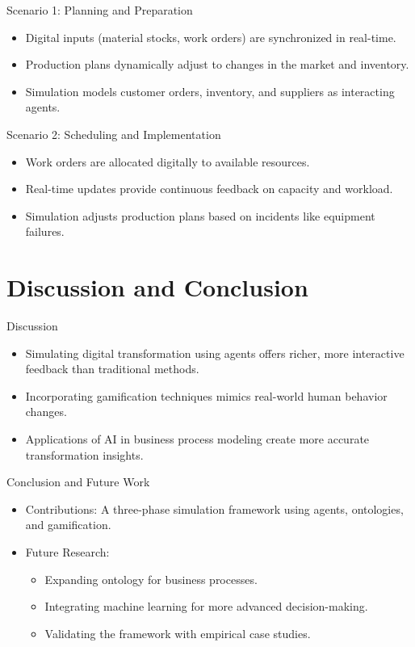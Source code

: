 \begin{frame}{Scenario 1: Planning and Preparation}
    \begin{itemize}
        \item Digital inputs (material stocks, work orders) are synchronized in real-time.
        \item Production plans dynamically adjust to changes in the market and inventory.
        \item Simulation models customer orders, inventory, and suppliers as interacting agents.
    \end{itemize}
\end{frame}

\begin{frame}{Scenario 2: Scheduling and Implementation}
    \begin{itemize}
        \item Work orders are allocated digitally to available resources.
        \item Real-time updates provide continuous feedback on capacity and workload.
        \item Simulation adjusts production plans based on incidents like equipment failures.
    \end{itemize}
\end{frame}

\section{Discussion and Conclusion}

\begin{frame}{Discussion}
    \begin{itemize}
        \item Simulating digital transformation using agents offers richer, more interactive feedback than traditional methods.
        \item Incorporating gamification techniques mimics real-world human behavior changes.
        \item Applications of AI in business process modeling create more accurate transformation insights.
    \end{itemize}
\end{frame}

\begin{frame}{Conclusion and Future Work}
    \begin{itemize}
        \item Contributions: A three-phase simulation framework using agents, ontologies, and gamification.
        \item Future Research:
        \begin{itemize}
            \item Expanding ontology for business processes.
            \item Integrating machine learning for more advanced decision-making.
            \item Validating the framework with empirical case studies.
        \end{itemize}
    \end{itemize}
\end{frame}
